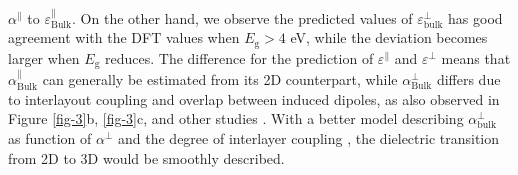 \documentclass[journal=ancac3,manuscript=article,email=true,hyperref=true,keywords=false]{achemso}
\begin{document}
$\alpha^{\parallel}$ to $\varepsilon_{\mathrm{Bulk}}^{\parallel}$. On
the other hand, we observe the predicted values of
$\varepsilon_{\mathrm{bulk}}^{\perp}$ has good agreement with the DFT
values when $E_{\mathrm{g}}>4$ eV, while the deviation becomes larger
when $E_{\mathrm{g}}$ reduces. The difference for the prediction of
$\varepsilon^{\parallel}$ and $\varepsilon^{\perp}$ means that
$\alpha^{\parallel}_{\mathrm{Bulk}}$ can generally be estimated from
its 2D counterpart, while $\alpha^{\perp}_{\mathrm{Bulk}}$ differs due
to interlayout coupling and overlap between induced dipoles, as also
observed in Figure \ref{fig-3}b, \ref{fig-3}c, and other studies
\cite{Andersen_2015_dielec_vdWH,Laturia_2018}. With a better model
describing $\alpha_{\mathrm{bulk}}^{\perp}$ as function of
$\alpha^{\perp}$ and the degree of interlayer coupling \cite{Tkatchenko_2012}, the dielectric transition from 2D to 3D would
be smoothly described. 
\end{document}
